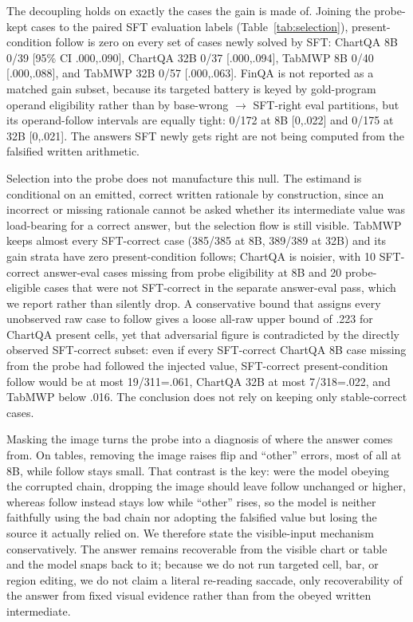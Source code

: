 \documentclass[11pt]{article}
\begin{document}
The decoupling holds on exactly the cases the gain is made of. Joining the probe-kept cases to the paired SFT evaluation labels (Table~\ref{tab:selection}), present-condition follow is zero on every set of cases newly solved by SFT: ChartQA 8B 0/39 [95\% CI .000,.090], ChartQA 32B 0/37 [.000,.094], TabMWP 8B 0/40 [.000,.088], and TabMWP 32B 0/57 [.000,.063]. FinQA is not reported as a matched gain subset, because its targeted battery is keyed by gold-program operand eligibility rather than by base-wrong $\to$ SFT-right eval partitions, but its operand-follow intervals are equally tight: 0/172 at 8B [0,.022] and 0/175 at 32B [0,.021]. The answers SFT newly gets right are not being computed from the falsified written arithmetic.

Selection into the probe does not manufacture this null. The estimand is conditional on an emitted, correct written rationale by construction, since an incorrect or missing rationale cannot be asked whether its intermediate value was load-bearing for a correct answer, but the selection flow is still visible. TabMWP keeps almost every SFT-correct case (385/385 at 8B, 389/389 at 32B) and its gain strata have zero present-condition follows; ChartQA is noisier, with 10 SFT-correct answer-eval cases missing from probe eligibility at 8B and 20 probe-eligible cases that were not SFT-correct in the separate answer-eval pass, which we report rather than silently drop. A conservative bound that assigns every unobserved raw case to follow gives a loose all-raw upper bound of .223 for ChartQA present cells, yet that adversarial figure is contradicted by the directly observed SFT-correct subset: even if every SFT-correct ChartQA 8B case missing from the probe had followed the injected value, SFT-correct present-condition follow would be at most 19/311=.061, ChartQA 32B at most 7/318=.022, and TabMWP below .016. The conclusion does not rely on keeping only stable-correct cases.

Masking the image turns the probe into a diagnosis of where the answer comes from. On tables, removing the image raises flip and ``other'' errors, most of all at 8B, while follow stays small. That contrast is the key: were the model obeying the corrupted chain, dropping the image should leave follow unchanged or higher, whereas follow instead stays low while ``other'' rises, so the model is neither faithfully using the bad chain nor adopting the falsified value but losing the source it actually relied on. We therefore state the visible-input mechanism conservatively. The answer remains recoverable from the visible chart or table and the model snaps back to it; because we do not run targeted cell, bar, or region editing, we do not claim a literal re-reading saccade, only recoverability of the answer from fixed visual evidence rather than from the obeyed written intermediate.
\end{document}
